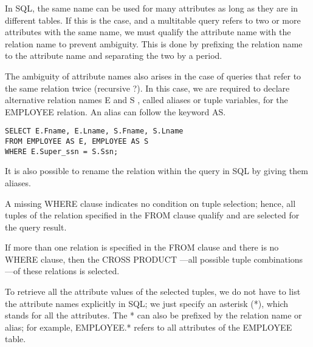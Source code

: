     \par In SQL, the same name can be used for many attributes as long as they are in different tables. If this is the case, and a multitable query refers to two or more attributes with the same name, we must qualify the attribute name with the relation name to prevent ambiguity. This is done by prefixing the relation name to the attribute name and separating the two by a period.
    \par The ambiguity of attribute names also arises in the case of queries that refer to the
same relation twice (recursive ?). In this case, we are required to declare alternative relation names E and S , called aliases or tuple variables, for the EMPLOYEE relation. An alias can follow the keyword AS.
      \begin{lstlisting}
SELECT E.Fname, E.Lname, S.Fname, S.Lname
FROM EMPLOYEE AS E, EMPLOYEE AS S
WHERE E.Super_ssn = S.Ssn;
      \end{lstlisting}
    \par It is also possible to rename the relation  within the query in SQL by giving them aliases.

    \par A missing WHERE clause indicates no condition on tuple selection; hence, all tuples of the relation specified in the FROM clause qualify and are selected for the query result.

    \par If more than one relation is specified in the FROM clause and there is no WHERE clause, then the CROSS PRODUCT —all possible tuple combinations—of these relations is selected.

    \par To retrieve all the attribute values of the selected tuples, we do not have to list the attribute names explicitly in SQL; we just specify an asterisk (*), which stands for all the attributes. The * can also be prefixed by the relation name or alias; for example, EMPLOYEE.* refers to all attributes of the EMPLOYEE table.

